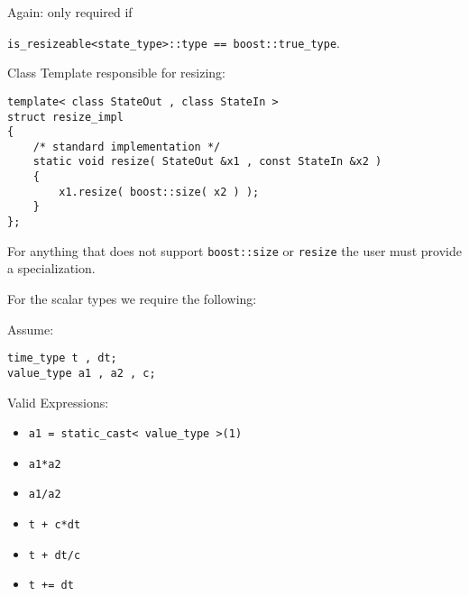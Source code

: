 \begin{frame}[fragile]
Again: only required if \\
\centerline{\lstinline+is_resizeable<state_type>::type == boost::true_type+.}
\vspace{0.5em}

Class Template responsible for resizing:
\begin{lstlisting}
template< class StateOut , class StateIn >
struct resize_impl
{
    /* standard implementation */
    static void resize( StateOut &x1 , const StateIn &x2 )
    {
        x1.resize( boost::size( x2 ) );
    }
};
\end{lstlisting}

For anything that does not support \lstinline+boost::size+ or \lstinline+resize+ the user must provide a specialization.

\end{frame}


\begin{frame}[fragile]

For the scalar types we require the following:

Assume:
\begin{lstlisting}
time_type t , dt;
value_type a1 , a2 , c;
\end{lstlisting}

Valid Expressions:
\begin{itemize}
 \item \lstinline+a1 = static_cast< value_type >(1)+
 \item \lstinline+a1*a2+
 \item \lstinline+a1/a2+
 \item \lstinline!t + c*dt!
 \item \lstinline!t + dt/c!
 \item \lstinline!t += dt!
\end{itemize}

\end{frame}



